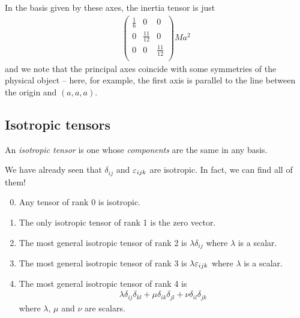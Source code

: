 \documentclass{../../template/note}
\begin{document}
\begin{example*}[hard]
        In the basis given by these axes, the inertia tensor is just
        \begin{align*}
            \begin{pmatrix}
                \frac 1 6 & 0 & 0 \\
                0 & \frac {11}{12} & 0 \\
                0 & 0 & \frac{11}{12} \\
            \end{pmatrix}Ma^2
        \end{align*}
        and we note that the principal axes coincide with some symmetries of the physical object -- here, for example, the first axis is parallel to the line between the origin and \((a, a, a)\).        
    \end{example*}
    
    \subsection{Isotropic tensors}

    \begin{definition*}
        An \emph{isotropic tensor} is one whose \emph{components} are the same in any basis.
    \end{definition*}
    
    We have already seen that \(\delta_{ij}\) and \(\varepsilon_{ijk}\) are isotropic. In fact, we can find all of them!

    \begin{enumerate}
        \setcounter{enumi}{-1}
        \item Any tensor of rank 0 is isotropic.
        \item The only isotropic tensor of rank 1 is the zero vector.
        \item The most general isotropic tensor of rank 2 is \(\lambda \delta_{ij}\) where \(\lambda\) is a scalar.
        \item The most general isotropic tensor of rank 3 is \(\lambda \varepsilon_{ijk}\) where \(\lambda\) is a scalar.
        \item The most general isotropic tensor of rank 4 is
        \begin{align*}
            \lambda \delta_{ij}\delta_{kl} + \mu \delta_{ik}\delta_{jl} + \nu \delta_{il}\delta_{jk}
        \end{align*}
        where \(\lambda\), \(\mu\) and \(\nu\) are scalars.        
    \end{enumerate}
    
\end{document}
